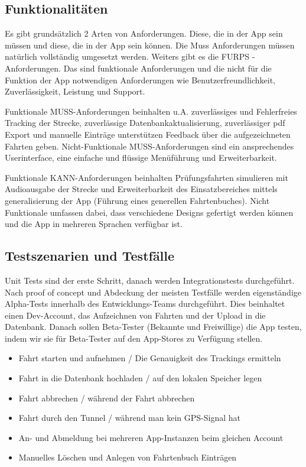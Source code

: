 \subsection{Funktionalitäten}

	Es gibt grundsätzlich 2 Arten von Anforderungen. Diese, die in der App sein müssen und diese, die in der App sein können. Die Muss Anforderungen müssen natürlich vollständig umgesetzt werden. Weiters gibt es die FURPS - Anforderungen. Das sind funktionale Anforderungen und die nicht für die Funktion der App notwendigen Anforderungen wie Benutzerfreundlichkeit, Zuverlässigkeit, Leistung und Support. \par
	Funktionale MUSS-Anforderungen beinhalten u.A. zuverlässiges und Fehlerfreies Tracking der Strecke, zuverlässige Datenbankaktualisierung, zuverlässiger pdf Export und manuelle Einträge unterstützen Feedback über die aufgezeichneten Fahrten geben. Nicht-Funktionale MUSS-Anforderungen sind ein ansprechendes Userinterface, eine einfache und flüssige Menüführung und Erweiterbarkeit. \par
	Funktionale KANN-Anforderungen beinhalten Prüfungsfahrten simulieren mit Audioausgabe der Strecke und Erweiterbarkeit des Einsatzbereiches mittels generalisierung der App (Führung eines generellen Fahrtenbuches). Nicht Funktionale umfassen dabei, dass verschiedene Designs gefertigt werden können und die App in mehreren Sprachen verfügbar ist.

\subsection{Testszenarien und Testfälle}

Unit Tests sind der erste Schritt, danach werden Integrationstests durchgeführt. Nach proof of concept und Abdeckung der meisten Testfälle werden eigenständige Alpha-Tests innerhalb des Entwicklungs-Teams durchgeführt. Dies beinhaltet einen Dev-Account, das Aufzeichnen von Fahrten und der Upload in die Datenbank. Danach sollen Beta-Tester (Bekannte und Freiwillige) die App testen, indem wir sie für Beta-Tester auf den App-Stores zu Verfügung stellen.
\begin{itemize}
	\item Fahrt starten und aufnehmen / Die Genauigkeit des Trackings ermitteln
	\item Fahrt in die Datenbank hochladen / auf den lokalen Speicher legen
	\item Fahrt abbrechen / während der Fahrt abbrechen
	\item Fahrt durch den Tunnel / während man kein GPS-Signal hat
	\item An- und Abmeldung bei mehreren App-Instanzen beim gleichen Account
	\item Manuelles Löschen und Anlegen von Fahrtenbuch Einträgen
\end{itemize}
